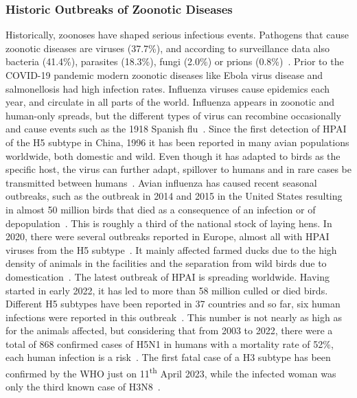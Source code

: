 \subsubsection*{Historic Outbreaks of Zoonotic Diseases}
Historically, zoonoses have shaped serious infectious events. Pathogens that cause zoonotic diseases are viruses (37.7\%), and according to surveillance data also bacteria (41.4\%), parasites (18.3\%), fungi (2.0\%) or prions (0.8\%)~\cite{salyer2017prioritizing}. Prior to the \ac{COVID-19} pandemic modern zoonotic diseases like Ebola virus disease and salmonellosis had high infection rates. Influenza viruses cause epidemics each year, and circulate in all parts of the world. Influenza appears in zoonotic and human-only spreads, but the different types of virus can recombine occasionally and cause events such as the 1918 Spanish flu~\cite{garten2009antigenic, gibbs2001recombination}. Since the first detection of \ac{HPAI} of the H5 subtype in China, 1996 it has been reported in many avian populations worldwide, both domestic and wild. Even though it has adapted to birds as the specific host, the virus can further adapt, spillover to humans and in rare cases be transmitted between humans~\cite{webster1992evolution}. Avian influenza has caused recent seasonal outbreaks, such as the outbreak in 2014 and 2015 in the United States resulting in almost 50 million birds that died as a consequence of an infection or of depopulation~\cite{lee2016highly}. This is roughly a third of the national stock of laying hens. In 2020, there were several outbreaks reported in Europe, almost all with \ac{HPAI} viruses from the H5 subtype~\cite{lewis2021emergence}. It mainly affected farmed ducks due to the high density of animals in the facilities and the separation from wild birds due to domestication~\cite{lewis2021emergence}. The latest outbreak of \ac{HPAI} is spreading worldwide. Having started in early 2022, it has led to more than 58 million culled or died birds. Different H5 subtypes have been reported in 37 countries and so far, six human infections were reported in this outbreak~\cite{authority2023avian}. This number is not nearly as high as for the animals affected, but considering that from 2003 to 2022, there were a total of 868 confirmed cases of H5N1 in humans with a mortality rate of 52\%, each human infection is a risk~\cite{authority2023avian}. The first fatal case of a H3 subtype has been confirmed by the \ac{WHO} just on 11\textsuperscript{th} April 2023, while the infected woman was only the third known case of H3N8~\cite{who2023china}.

